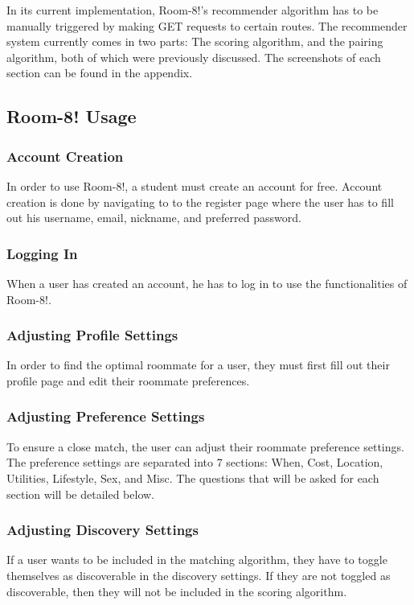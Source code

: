 \documentclass[journal]{IEEEtran}
\begin{document}
In its current implementation, Room-8!'s recommender algorithm has to be manually triggered by making GET requests to
certain routes. The recommender system currently comes in two parts: The scoring algorithm, and the pairing algorithm,
both of which were previously discussed. The screenshots of each section can be found in the appendix.

    \subsection{Room-8! Usage}
        \subsubsection{Account Creation}
        In order to use Room-8!, a student must create an account for free. Account creation is done by navigating to
        to the register page where the user has to fill out his username, email, nickname, and preferred password.
        \subsubsection{Logging In}
        When a user has created an account, he has to log in to use the functionalities of Room-8!.
        \subsubsection{Adjusting Profile Settings}
        In order to find the optimal roommate for a user, they must first fill out their profile page and edit their
        roommate preferences.
        \subsubsection{Adjusting Preference Settings}
        To ensure a close match, the user can adjust their roommate preference settings. The preference settings are
        separated into 7 sections: When, Cost, Location, Utilities, Lifestyle, Sex, and Misc. The questions that will be
        asked for each section will be detailed below.
        \subsubsection{Adjusting Discovery Settings}
        If a user wants to be included in the matching algorithm, they have to toggle themselves as discoverable in the
        discovery settings. If they are not toggled as discoverable, then they will not be included in the scoring
        algorithm.
\end{document}
